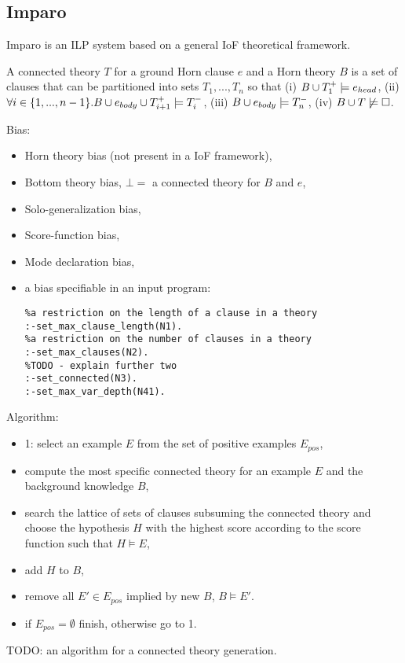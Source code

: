 \iffalse
\subsection{ProGolem}
\begin{itemize}
\item Inverse Entailment,
\item co-generalization, 
\end{itemize}
\fi

\subsection{Imparo\cite{kimber2009}}
Imparo is an ILP system based on a general IoF theoretical framework.
\begin{defn}
A connected theory $T$ for a ground Horn clause $e$ and a Horn theory $B$ is a set of clauses that can be partitioned into sets $T_1, ..., T_n$ so that
(i) $B \cup T_1^+ \models e_{head}$,
(ii) $\forall i \in \{1, ..., n-1\}. B \cup e_{body} \cup T_{i+1}^+ \models T_i^-$,
(iii) $B \cup e_{body} \models T_n^-$,
(iv) $B \cup T \not\models \square$.

\end{defn}
Bias:
\begin{itemize}
\item Horn theory bias (not present in a IoF framework),
\item Bottom theory bias, $\bot=$ a connected theory for $B$ and $e$,
\item Solo-generalization bias,
\item Score-function bias,
\item Mode declaration bias,
\item a bias specifiable in an input program:
\begin{lstlisting}
%a restriction on the length of a clause in a theory
:-set_max_clause_length(N1).
%a restriction on the number of clauses in a theory
:-set_max_clauses(N2).
%TODO - explain further two
:-set_connected(N3).
:-set_max_var_depth(N41).
\end{lstlisting}
\end{itemize}
Algorithm:
\begin{itemize}
\item 1: select an example $E$ from the set of positive examples $E_{pos}$,
\item compute the most specific connected theory for an example $E$ and the background knowledge $B$,
\item search the lattice of sets of clauses subsuming the connected theory and choose the hypothesis $H$ with the highest score according to the score function such that $H \models E$,
\item add $H$ to $B$,
\item remove all $E' \in E_{pos}$ implied by new $B$, $B \models E'$.
\item if $E_{pos} = \emptyset$ finish, otherwise go to 1.
\end{itemize}
TODO: an algorithm for a connected theory generation.

